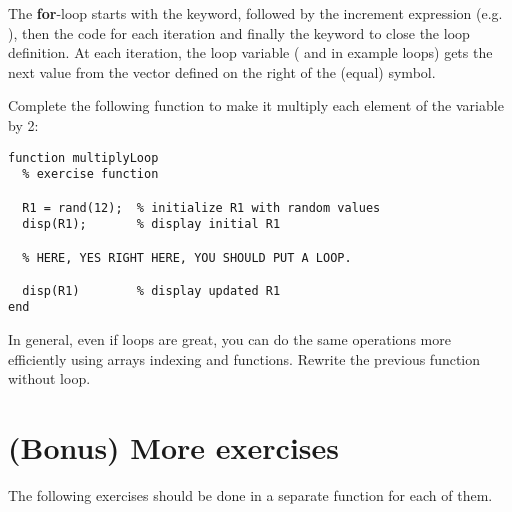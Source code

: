 \documentclass{article}
\begin{document}
The \textbf{for}-loop starts with the  keyword, followed by the increment expression (e.g. ), then the code for each iteration and finally the  keyword to close the loop definition.
At each iteration, the loop variable ( and  in example loops) gets the next value from the vector defined on the right of the \mcode{=} (equal) symbol.

Complete the following function to make it multiply each element of the variable  by 2:
\begin{lstlisting}
function multiplyLoop
  % exercise function

  R1 = rand(12);  % initialize R1 with random values
  disp(R1);       % display initial R1

  % HERE, YES RIGHT HERE, YOU SHOULD PUT A LOOP.

  disp(R1)        % display updated R1
end
\end{lstlisting}

In general, even if loops are great, you can do the same operations more efficiently using arrays indexing and functions.
Rewrite the previous function  without loop.


\section{(Bonus) More exercises}

The following exercises should be done in a separate function for each of them.
\end{document}
